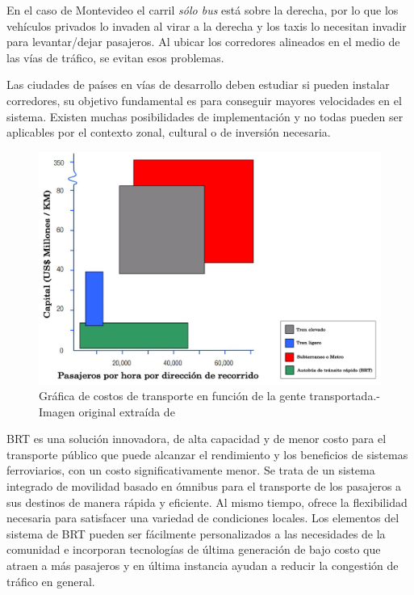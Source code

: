 En el caso de Montevideo el carril \emph{sólo bus} está sobre la derecha, por lo que los vehículos privados lo invaden al virar a la derecha y los taxis lo necesitan invadir para levantar/dejar pasajeros. Al ubicar los corredores alineados en el medio de las vías de tráfico, se evitan esos problemas.  

Las ciudades de países en vías de desarrollo deben estudiar si pueden instalar corredores, su objetivo fundamental es para conseguir mayores velocidades en el sistema. Existen muchas posibilidades de implementación y no todas pueden ser aplicables por el contexto zonal, cultural o de inversión necesaria.

\begin{figure}[H]
	\centering
	\includegraphics[width=0.9\linewidth]{Figures/costo_transporte}
	\caption[Gráfica de costos de transporte en función de la gente transportada.]{Gráfica de costos de transporte en función de la gente transportada.- Imagen original extraída de \citep{ITDP}		
	}
	\label{fig:Grafica de costos de otros medios de transporte}
\end{figure}

BRT es una solución innovadora, de alta capacidad y de menor costo para el transporte público que puede alcanzar el rendimiento y los beneficios de sistemas ferroviarios, con un costo significativamente menor. Se trata de un sistema integrado de movilidad basado en ómnibus para el transporte de los pasajeros a sus destinos de manera rápida y eficiente. Al mismo tiempo, ofrece la flexibilidad necesaria para satisfacer una variedad de condiciones locales. Los elementos del sistema de BRT pueden ser fácilmente personalizados a las necesidades de la comunidad e incorporan tecnologías de última generación de bajo costo que atraen a más pasajeros y en última instancia ayudan a reducir la congestión de tráfico en general.


